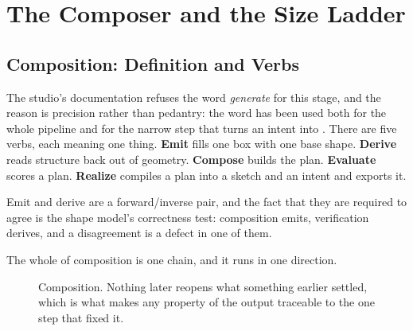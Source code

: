 \chapter{The Composer and the Size Ladder}
\label{ch:composer}

\section{Composition: Definition and Verbs}

The studio's documentation refuses the word \emph{generate} for this stage, and
the reason is precision rather than pedantry: the word has been used both for the
whole pipeline and for the narrow step that turns an intent into .
There are five verbs, each meaning one thing. \textbf{Emit} fills one box with one
base shape. \textbf{Derive} reads structure back out of geometry. \textbf{Compose}
builds the plan. \textbf{Evaluate} scores a plan. \textbf{Realize} compiles a plan
into a sketch and an intent and exports it.

Emit and derive are a forward/inverse pair, and the fact that they are required to
agree is the shape model's correctness test: composition emits, verification
derives, and a disagreement is a defect in one of them.

The whole of composition is one chain, and it runs in one direction.

\begin{figure}[htbp]
\centering
{}
\caption{Composition. Nothing later reopens what something earlier settled, which
is what makes any property of the output traceable to the one step that fixed it.}
\label{fig:compose-chain}
\end{figure}

